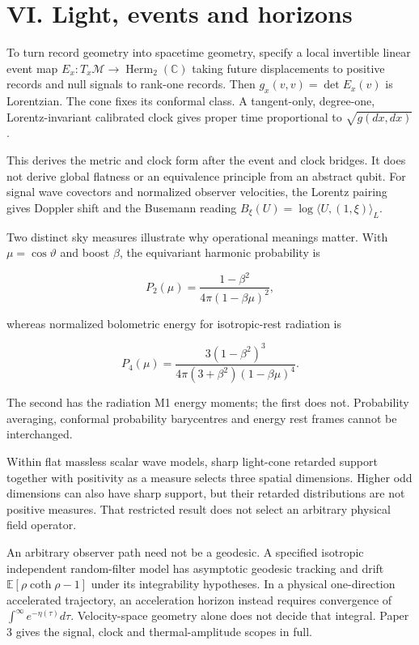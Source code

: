 \documentclass[
  11pt,
  a4paper,
]{article}
\begin{document}
\section{VI. Light, events and horizons}\label{vi.-light-events-and-horizons}

To turn record geometry into spacetime geometry, specify a local invertible linear event map \(E_x:T_x\mathcal M\to\operatorname{Herm}_2(\mathbb C)\) taking future displacements to positive records and null signals to rank-one records. Then \(g_x(v,v)=\det E_x(v)\) is Lorentzian. The cone fixes its conformal class. A tangent-only, degree-one, Lorentz-invariant calibrated clock gives proper time proportional to \(\sqrt{g(dx,dx)}\).

This derives the metric and clock form after the event and clock bridges. It does not derive global flatness or an equivalence principle from an abstract qubit. For signal wave covectors and normalized observer velocities, the Lorentz pairing gives Doppler shift and the Busemann reading \(B_\xi(U)=\log\langle U,(1,\xi)\rangle_L\).

Two distinct sky measures illustrate why operational meanings matter. With \(\mu=\cos\vartheta\) and boost \(\beta\), the equivariant harmonic probability is

\[P_2(\mu)=\frac{1-\beta^2}{4\pi(1-\beta\mu)^2},\]

whereas normalized bolometric energy for isotropic-rest radiation is

\[P_4(\mu)=\frac{3(1-\beta^2)^3}{4\pi(3+\beta^2)(1-\beta\mu)^4}.\]

The second has the radiation M1 energy moments; the first does not. Probability averaging, conformal probability barycentres and energy rest frames cannot be interchanged.

Within flat massless scalar wave models, sharp light-cone retarded support together with positivity as a measure selects three spatial dimensions. Higher odd dimensions can also have sharp support, but their retarded distributions are not positive measures. That restricted result does not select an arbitrary physical field operator.

An arbitrary observer path need not be a geodesic. A specified isotropic independent random-filter model has asymptotic geodesic tracking and drift \(\mathbb E[\rho\coth\rho-1]\) under its integrability hypotheses. In a physical one-direction accelerated trajectory, an acceleration horizon instead requires convergence of \(\int^\infty e^{-\eta(\tau)}d\tau\). Velocity-space geometry alone does not decide that integral. Paper 3 gives the signal, clock and thermal-amplitude scopes in full.
\end{document}

